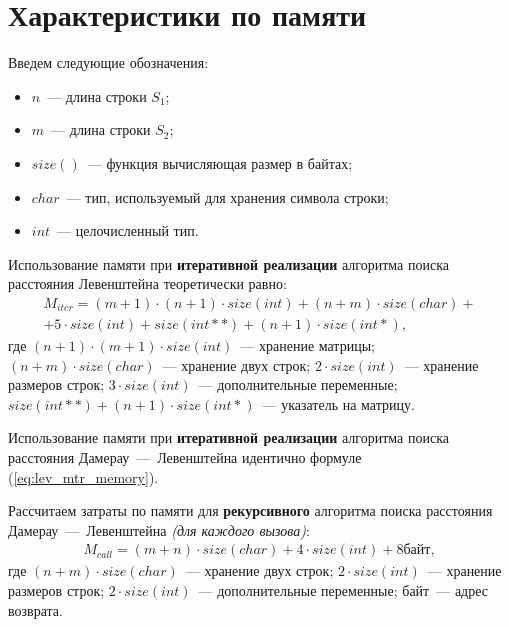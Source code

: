 \section{Характеристики по памяти}

Введем следующие обозначения:
\begin{itemize}
	\item$n$~--- длина строки $S_{1}$;
	\item$m$~--- длина строки $S_{2}$;
	\item$size()$~--- функция вычисляющая размер в байтах;
	\item $char$~--- тип, используемый для хранения символа строки;
	\item $int$~--- целочисленный тип.
\end{itemize}

Использование памяти при \textbf{итеративной реализации} алгоритма поиска расстояния Левенштейна теоретически равно:
\begin{equation}
	\label{eq:lev_mtr_memory}
	\begin{aligned}
		M_{iter} = (m + 1) \cdot (n + 1) \cdot size(int) + (n + m) \cdot size(char) + \\ + 5 \cdot size(int) + size(int **) + (n + 1) \cdot size(int *),
	\end{aligned}
\end{equation}
где $(n + 1) \cdot (m + 1) \cdot size(int)$~--- хранение матрицы;
\newline $(n + m) \cdot size(char)$~--- хранение двух строк;
\newline $2 \cdot size(int)$~--- хранение размеров строк;
\newline $3 \cdot size(int)$~--- дополнительные переменные;
\newline $size(int**) + (n + 1) \cdot size(int *)$~--- указатель на матрицу.

Использование памяти при \textbf{итеративной реализации} алгоритма поиска расстояния Дамерау~---~Левенштейна идентично формуле (\ref{eq:lev_mtr_memory}).

Рассчитаем затраты по памяти для \textbf{рекурсивного} алгоритма поиска расстояния Дамерау~---~Левенштейна\textit{ (для каждого вызова)}:
\begin{equation}
	\begin{aligned}
		M_{call} = (m + n) \cdot size(char) + 4 \cdot size(int) + 8 байт,
	\end{aligned}
\end{equation}
где $(n + m) \cdot size(char)$~--- хранение двух строк;
\newline $2 \cdot size(int)$~--- хранение размеров строк;
\newline $2 \cdot size(int)$~--- дополнительные переменные;
 байт~--- адрес возврата.


